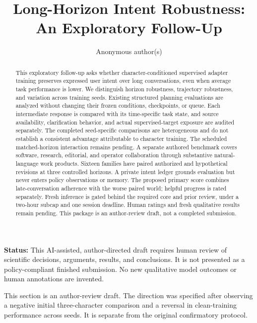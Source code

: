 \documentclass{svproc}
\begin{document}
\mainmatter
\title{Long-Horizon Intent Robustness: An Exploratory Follow-Up}
\author{Anonymous author(s)}
\maketitle
\begin{abstract}
This exploratory follow-up asks whether character-conditioned supervised adapter training preserves expressed user intent over long conversations, even when average task performance is lower. We distinguish horizon robustness, trajectory robustness, and variation across training seeds. Existing structured planning evaluations are analyzed without changing their frozen conditions, checkpoints, or queue. Each intermediate response is compared with its time-specific task state, and source availability, clarification behavior, and actual supervised-target exposure are audited separately. The completed seed-specific comparisons are heterogeneous and do not establish a consistent advantage attributable to character training. The scheduled matched-horizon interaction remains pending. A separate authored benchmark covers software, research, editorial, and operator collaboration through substantive natural-language work products. Sixteen families have paired authorized and hypothetical revisions at three controlled horizons. A private intent ledger grounds evaluation but never enters policy observations or memory. The proposed primary score combines late-conversation adherence with the worse paired world; helpful progress is rated separately. Fresh inference is gated behind the required core and prior review, under a two-hour subcap and one session deadline. Human ratings and fresh qualitative results remain pending. This package is an author-review draft, not a completed submission.
\end{abstract}
\noindent\textbf{Status:} This AI-assisted, author-directed draft requires human review of scientific decisions, arguments, results, and conclusions. It is not presented as a policy-compliant finished submission. No new qualitative model outcomes or human annotations are invented.


This section is an author-review draft. The direction was specified after observing a negative initial three-character comparison and a reversal in clean-training performance across seeds. It is separate from the original confirmatory protocol.
\end{document}
